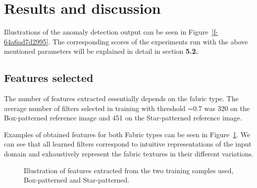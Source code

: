 \documentclass[3p,,preprint,review,12pt]{elsarticle}
\makeatletter
\def\fixFloatSize#1{}%
\makeatother
\begin{document}
\section{Results and discussion}
Illustrations of the anomaly detection output can be seen in Figure~\ref{f-64a6ad7d2995}. The corresponding scores of the experiments run with the above mentioned parameters will be explained in detail in section \textbf{5.2.}
\bgroup
\fixFloatSize{Figures/Figure9.png}
\begin{figure*}[!htbp]
\centering 
\makeatletter{}
\makeatother 
\caption{{Examples of anomaly detection results on the Box-patterned and Star-patterned samples : \textbf{(a) }input image; \textbf{(b)} ground truth image; \textbf{(c)} weighted defect probability map after anomaly detection; \textbf{(d)} final binarized result after 2D Max Entropy. }}
\label{f-64a6ad7d2995}
\end{figure*}
\egroup




\subsection{Features selected}The number of features extracted essentially depends on the fabric type. The average number of filters selected in training with threshold =0.7 was 320 on the Box-patterned reference image and 451 on the Star-patterned reference image. 

Examples of obtained features for both Fabric types can be seen in Figure~\ref{f-aeb5faa4a5e2}. We can see that all learned filters correspond to intuitive representations of the input domain and exhaustively represent the fabric textures in their different variations.


\bgroup
\fixFloatSize{Figures/Figure10.jpg}
\begin{figure}[!htbp]
\centering \makeatletter{}
\makeatother 
\caption{{Illustration of features extracted from the two training samples used, Box-patterned and Star-patterned.}}
\label{f-aeb5faa4a5e2}
\end{figure}
\egroup
\end{document}
